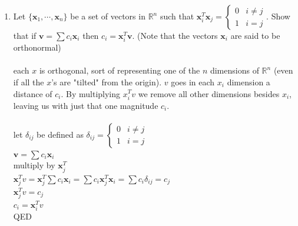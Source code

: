 \documentclass{article}
\begin{document}
{{\begin{enumerate}
\\therefore it $\bm x^T\bm y\neq0$ is a contradiction, and $\bm x^T\bm y$ must be zero
\\since we've proven both directions, we've proven the desired iff statement
\\QED
\newpage\item Let $\{\bm{x}_1,\cdots,\bm{x}_n\}$ be a set of vectors in $\mathbb{R}^n$ such that $\bm{x}_i^T\bm{x}_j=
\begin{cases}
0 & i\neq j\\
1 & i=j
\end{cases}
$. Show that if $\bm{v}=\sum c_i\bm{x}_i$ then $c_i=\bm{x}_i^T\bm{v}$. (Note that the vectors $\bm{x}_i$ are said to be orthonormal)
\\
\\each $x$ is orthogonal, sort of representing one of the $n$ dimensions of $\mathbb{R}^n$ (even if all the $x$'s are "tilted" from the origin). $v$ goes in each $x_i$ dimension a distance of $c_i$. By multiplying $x_i^Tv$ we remove all other dimensions besides $x_i$, leaving us with just that one magnitude $c_i$.
\\
\\let $\delta_{ij}$ be defined as $\delta_{ij}=\begin{cases}
0 & i\neq j\\
1 & i=j
\end{cases}
$
\\$\bm{v}=\sum c_i\bm{x}_i$
\\ multiply by $\bm x_j^T$
\\$\bm x_j^Tv=\bm x_j^T\sum c_i\bm x_i=\sum c_i\bm x_j^T\bm x_i=\sum c_i\delta_{ij}=c_j$
\\$\bm x_j^T v = c_j$
\\$c_i = \bm x_i^T v$
\\QED


\end{enumerate}}}
\end{document}
